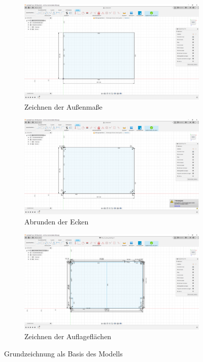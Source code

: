 \begin{figure}[h!tb]
	\begin{subfigure}[b]{.5\linewidth}
		\includegraphics[width=1\textwidth]{img/konstruktion_gehaeuse_001.png}
		\caption[Zeichnen der Außenmaße]{Zeichnen der Außenmaße}
		\label{fig:design-case-01}
	\end{subfigure}
	\begin{subfigure}[b]{.5\linewidth}
		\includegraphics[width=1\textwidth]{img/konstruktion_gehaeuse_002.png}
		\caption[Abrunden der Ecken]{Abrunden der Ecken}
		\label{fig:design-case-02}
	\end{subfigure}
	\begin{subfigure}[b]{.5\linewidth}
		\includegraphics[width=1\textwidth]{img/konstruktion_gehaeuse_003.png}
		\caption[Zeichnen der Auflageflächen für das Gehäuse]{Zeichnen der Auflageflächen}
		\label{fig:design-case-03}
	\end{subfigure}
	\caption[Grundzeichnung als Basis des Modells]{Grundzeichnung als Basis des Modells}
	\label{fig:design-case-base}
\end{figure}\par
